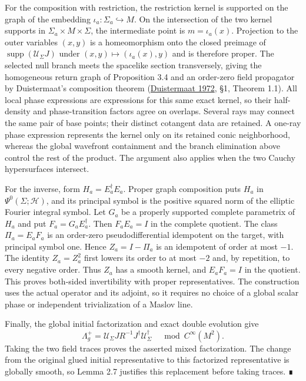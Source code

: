 \documentclass[
  english,
  11pt,
  reqno]{amsart}
\begin{document}
For the composition with restriction, the restriction kernel is
supported on the graph of the embedding
\(\iota_a:\Sigma_a\hookrightarrow M\). On the intersection of the two
kernel supports in \(\Sigma_a\times M\times\Sigma\), the intermediate
point is \(m=\iota_a(x)\). Projection to the outer variables \((x,y)\)
is a homeomorphism onto the closed preimage of
\(\operatorname{supp}(\mathcal U_\Sigma J)\) under
\((x,y)\mapsto(\iota_a(x),y)\) and is therefore proper. The selected
null branch meets the spacelike section transversely, giving the
homogeneous return graph of Proposition 3.4 and an order-zero field
propagator by Duistermaat's composition theorem
(\hyperref[ref-Duistermaat1972]{Duistermaat 1972}, §1, Theorem 1.1). All
local phase expressions are expressions for this same exact kernel, so
their half-density and phase-transition factors agree on overlaps.
Several rays may connect the same pair of base points; their distinct
cotangent data are retained. A one-ray phase expression represents the
kernel only on its retained conic neighborhood, whereas the global
wavefront containment and the branch elimination above control the rest
of the product. The argument also applies when the two Cauchy
hypersurfaces intersect.

For the inverse, form \(H_a=E_a^\dagger E_a\). Proper graph composition
puts \(H_a\) in \(\Psi^0(\Sigma;\mathcal H)\), and its principal symbol
is the positive squared norm of the elliptic Fourier integral symbol.
Let \(G_a\) be a properly supported complete parametrix of \(H_a\) and
put \(F_a=G_aE_a^\dagger\). Then \(F_aE_a=I\) in the complete quotient.
The class \(\Pi_a=E_aF_a\) is an order-zero pseudodifferential
idempotent on the target, with principal symbol one. Hence
\(Z_a=I-\Pi_a\) is an idempotent of order at most \(-1\). The identity
\(Z_a=Z_a^2\) first lowers its order to at most \(-2\) and, by
repetition, to every negative order. Thus \(Z_a\) has a smooth kernel,
and \(E_aF_a=I\) in the quotient. This proves both-sided invertibility
with proper representatives. The construction uses the actual operator
and its adjoint, so it requires no choice of a global scalar phase or
independent trivialization of a Maslov line.

Finally, the global initial factorization and exact double evolution
give \[
\Lambda_g^+=\mathcal U_\Sigma JR^{-1}J^\dagger\mathcal U_\Sigma^\dagger
\quad\bmod C^\infty(M^2).
\] Taking the two field traces proves the asserted mixed factorization.
The change from the original glued initial representative to this
factorized representative is globally smooth, so Lemma 2.7 justifies
this replacement before taking traces. ∎
\end{document}
